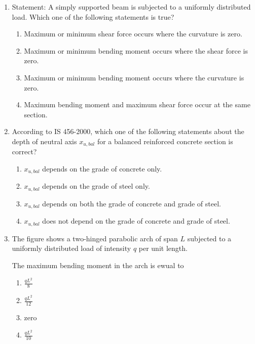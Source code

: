 \documentclass[journal,9pt,onecolumn]{IEEEtran}
\begin{document}
\begin{enumerate}
\item Statement: A simply supported beam is subjected to a uniformly distributed load. Which one of the following statements is true?
\begin{enumerate}
    \item Maximum or minimum shear force occurs where the curvature is zero.
    \item Maximum or minimum bending moment occurs where the shear force is zero.
    \item Maximum or minimum bending moment occurs where the curvature is zero.
    \item Maximum bending moment and maximum shear force occur at the same section.
\end{enumerate}

\item According to IS 456-2000, which one of the following statements about the depth of neutral axis $x_{u,bal}$ for a balanced reinforced concrete section is correct?
    \begin{enumerate}
        \item $x_{u,bal}$ depends on the grade of concrete only.
        \item $x_{u,bal}$ depends on the grade of steel only.
        \item $x_{u,bal}$ depends on both the grade of concrete and grade of steel.
        \item $x_{u,bal}$ does not depend on the grade of concrete and grade of steel.
    \end{enumerate}



\item The figure shows a two-hinged parabolic arch of span $L$ subjected to a uniformly distributed load of intensity $q$ per unit length. 
\begin{center}
    
\end{center}
The maximum bending moment in the arch is ewual to
\begin{multicols}{4}
    \begin{enumerate}
        \item $\frac{qL^2}{8}$
        \item $\frac{qL^2}{12}$
        \item zero
        \item $\frac{qL^2}{10}$
    \end{enumerate}
\end{multicols}


\end{enumerate}
\end{document}
